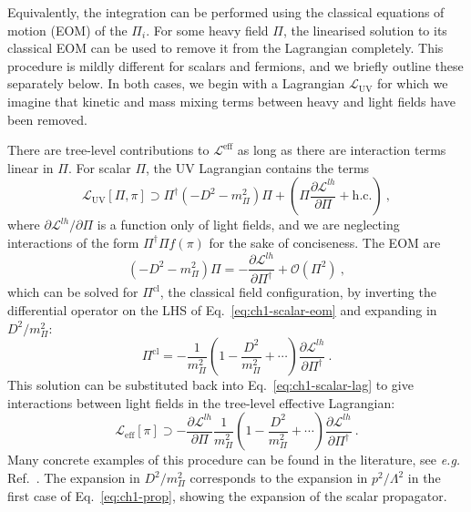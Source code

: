 Equivalently, the integration can be performed using the classical equations of
motion (EOM) of the $\Pi_{i}$. For some heavy field $\Pi$, the linearised
solution to its classical EOM can be used to remove it from the Lagrangian
completely. This procedure is mildly different for scalars and fermions, and we
briefly outline these separately below. In both cases, we begin with a
Lagrangian $\mathscr{L}_{\text{UV}}$ for which we imagine that kinetic and mass
mixing terms between heavy and light fields have been removed.

There are tree-level contributions to $\mathscr{L}^{\text{eff}}$ as long as
there are interaction terms linear in $\Pi$. For scalar $\Pi$, the UV Lagrangian
contains the terms
\begin{equation}
  \label{eq:ch1-scalar-lag}
 \mathscr{L}_{\text{UV}}[\Pi, \pi] \supset \Pi^{\dagger} (- D^{2} - m_{\Pi}^{2}) \Pi + \left(\Pi \frac{\partial \mathscr{L}^{lh}}{\partial \Pi} + \text{h.c.} \right) \ ,
\end{equation}
where $\partial \mathscr{L}^{lh} / \partial \Pi$ is a function only of
light fields, and we are neglecting interactions of the form
$\Pi^{\dagger} \Pi f(\pi)$ for the sake of conciseness. The EOM are
\begin{equation}
  \label{eq:ch1-scalar-eom}
 (- D^{2} - m_{\Pi}^{2}) \Pi = - \frac{\partial \mathscr{L}^{lh}}{\partial \Pi^{\dagger}} + \mathcal{O}(\Pi^{2}) \ ,
\end{equation}
which can be solved for $\Pi^{\text{cl}}$, the classical field configuration, by
inverting the differential operator on the LHS of Eq.~\eqref{eq:ch1-scalar-eom} and
expanding in $D^{2} / m_{\Pi}^{2}$:
\begin{equation}
  \label{eq:ch1-scalar-repl}
  \Pi^{\text{cl}} = - \frac{1}{m_{\Pi}^{2}} \left( 1 - \frac{D^{2}}{m_{\Pi}^{2}}  + \cdots \right) \frac{\partial \mathscr{L}^{lh}}{\partial \Pi^{\dagger}} \ .
\end{equation}
This solution can be substituted back into Eq.~\eqref{eq:ch1-scalar-lag} to give
interactions between light fields in the tree-level effective Lagrangian:
\begin{equation}
  \label{eq:ch1-classical-efflag-scalar}
  \mathscr{L}_{\text{eff}}[\pi] \supset - \frac{\partial \mathscr{L}^{lh}}{\partial \Pi} \frac{1}{m_{\Pi}^{2}} \left( 1 - \frac{D^{2}}{m_{\Pi}^{2}} + \cdots \right) \frac{\partial \mathscr{L}^{lh}}{\partial \Pi^{\dagger}} \ .
\end{equation}
Many concrete examples of this procedure can be found in the literature, see
\textit{e.g.} Ref.~\cite{Henning:2014wua}. The expansion in $D^{2}/m_{\Pi}^{2}$
corresponds to the expansion in $p^{2} / \Lambda^{2}$ in the first case of
Eq.~\eqref{eq:ch1-prop}, showing the expansion of the scalar propagator.

